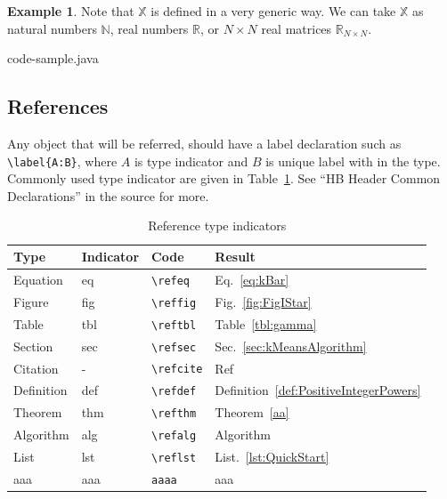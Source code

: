 \documentclass[pre,twocolumn,showkeys,longbibliography]{revtex4-1}
\newcommand{\reffig}[1]{Fig.~\ref{#1}}
\newcommand{\refeq}[1]{Eq.~\ref{#1}}
\newcommand{\reftbl}[1]{Table~\ref{#1}}
\newcommand{\refsec}[1]{Sec.~\ref{#1}}
\newcommand{\refcite}[1]{Ref~\cite{#1}}
\newcommand{\refalg}[1]{Algorithm~\cite{#1}}
\newcommand{\reflst}[1]{List.~\ref{#1}}  %
\newcommand{\refthm}[1]{Theorem~\ref{#1}}
\newcommand{\refdef}[1]{Definition~\ref{#1}}
\theoremstyle{plain}%
\theoremstyle{definition}
\newtheorem{exmp}{Example}[section]
\theoremstyle{remark}
\newcommand{\hSoX}{\mathbb{X}} %
\newcommand{\hSoN}{\mathbb{N}} %
\newcommand{\hSoR}{\mathbb{R}} %
\begin{document}
\begin{exmp}
	\label{exp:Generic}
	Note that $\hSoX$ is defined in a very generic way.
	We can take $\hSoX$ as 
	natural numbers $\hSoN$,
	real numbers $\hSoR$, or
	$N \times N$ real matrices $\hSoR_{N \times N}$.
\end{exmp}


	{code-sample.java}




\subsection{References}

Any object that will be referred,
should have a label declaration such as
\verb!\label{A:B}!,
where 
$A$ is type indicator and
$B$ is unique label with in the type.
Commonly used type indicator are given in \reftbl{tbl:TypeIndicators}.
See ``HB Header Common Declarations'' in the source for more.



\begin{table}[th]
	\caption{Reference type indicators}
	\begin{center}
	\begin{tabular}{|l |l |l |l |}
		\hline
		Type
		&Indicator
		&Code
		&Result\\
		\hline
		Equation
		&eq
		&\verb!\refeq!
		&\refeq{eq:kBar}\\
		Figure
		&fig
		&\verb!\reffig!
		&\reffig{fig:FigIStar}\\
		Table
		&tbl
		&\verb!\reftbl!
		&\reftbl{tbl:gamma}\\
		Section
		&sec
		&\verb!\refsec!
		&\refsec{sec:kMeansAlgorithm}\\
		Citation
		&-
		&\verb!\refcite!
		&\refcite{duda2012pattern}\\
		Definition
		&def
		&\verb!\refdef!
		&\refdef{def:PositiveIntegerPowers}\\
		Theorem
		&thm
		&\verb!\refthm!
		&\refthm{aa}\\
		Algorithm
		&alg
		&\verb!\refalg!
		&\refalg{aaa}\\
		List
		&lst
		&\verb!\reflst!
		&\reflst{lst:QuickStart}\\
		aaa
		&aaa
		&\verb!aaaa!
		&aaa\\
		\hline
	\end{tabular}
	\end{center}
	\label{tbl:TypeIndicators}
\end{table}%
\end{document}
